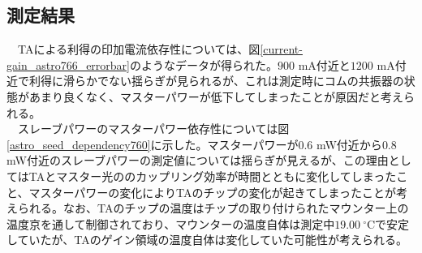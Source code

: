 \documentclass[uplatex, dvipdfmx, a4paper, report, papersize, 11pt]{jsbook}
\begin{document}
\subsection{測定結果}
　TAによる利得の印加電流依存性については、図\ref{current-gain_astro766_errorbar}のようなデータが得られた。$900$ mA付近と$1200$ mA付近で利得に滑らかでない揺らぎが見られるが、これは測定時にコムの共振器の状態があまり良くなく、マスターパワーが低下してしまったことが原因だと考えられる。\\
　スレーブパワーのマスターパワー依存性については図\ref{astro_seed_dependency760}に示した。マスターパワーが$0.6$ mW付近から$0.8$ mW付近のスレーブパワーの測定値については揺らぎが見えるが、この理由としてはTAとマスター光ののカップリング効率が時間とともに変化してしまったこと、マスターパワーの変化によりTAのチップの変化が起きてしまったことが考えられる。なお、TAのチップの温度はチップの取り付けられたマウンター上の温度京を通して制御されており、マウンターの温度自体は測定中$19.00\ ^\circ$Cで安定していたが、TAのゲイン領域の温度自体は変化していた可能性が考えられる。
\end{document}

